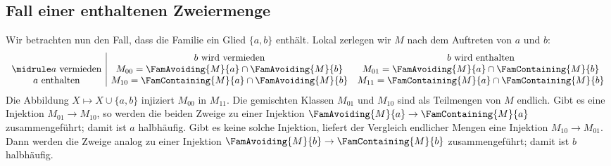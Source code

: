 \documentclass[main.tex]{subfiles}
\begin{document}
\begin{tabproof}




\end{tabproof}


\subsection{Fall einer enthaltenen Zweiermenge}

Wir betrachten nun den Fall, dass die Familie ein Glied \(\{a,b\}\)
enthält. Lokal zerlegen wir \(M\) nach dem Auftreten von \(a\) und \(b\):
\[
\begin{array}{c|cc}
 & b\text{ wird vermieden} & b\text{ wird enthalten}\\
\midrule
a\text{ vermieden} &
M_{00}=\FamAvoiding{M}{a}\cap\FamAvoiding{M}{b} &
M_{01}=\FamAvoiding{M}{a}\cap\FamContaining{M}{b}\\
a\text{ enthalten} &
M_{10}=\FamContaining{M}{a}\cap\FamAvoiding{M}{b} &
M_{11}=\FamContaining{M}{a}\cap\FamContaining{M}{b}
\end{array}
\]
Die Abbildung \(X\mapsto X\cup\{a,b\}\) injiziert \(M_{00}\) in
\(M_{11}\). Die gemischten Klassen \(M_{01}\) und \(M_{10}\) sind als
Teilmengen von \(M\) endlich. Gibt es eine Injektion
\(M_{01}\to M_{10}\), so werden die beiden Zweige zu einer Injektion
\(\FamAvoiding{M}{a}\to\FamContaining{M}{a}\) zusammengeführt; damit ist
\(a\) halbhäufig. Gibt es keine solche Injektion, liefert der Vergleich
endlicher Mengen eine Injektion \(M_{10}\to M_{01}\). Dann werden die
Zweige analog zu einer Injektion
\(\FamAvoiding{M}{b}\to\FamContaining{M}{b}\) zusammengeführt; damit ist
\(b\) halbhäufig.
\end{document}
